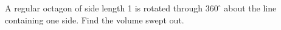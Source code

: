 A regular octagon of side length 1 is rotated through $360^\circ$ about the line containing one side. Find the volume swept out.
